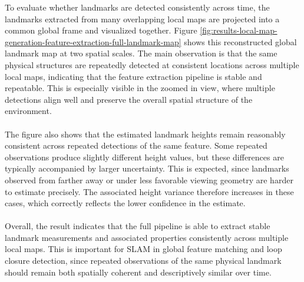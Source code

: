 \noindent
To evaluate whether landmarks are detected consistently across time, the landmarks extracted from many overlapping local maps are projected into a common global frame and visualized together. Figure \ref{fig:results-local-map-generation-feature-extraction-full-landmark-map} shows this reconstructed global landmark map at two spatial scales. The main observation is that the same physical structures are repeatedly detected at consistent locations across multiple local maps, indicating that the feature extraction pipeline is stable and repeatable. This is especially visible in the zoomed in view, where multiple detections align well and preserve the overall spatial structure of the environment.
\\ \\
The figure also shows that the estimated landmark heights remain reasonably consistent across repeated detections of the same feature. Some repeated observations produce slightly different height values, but these differences are typically accompanied by larger uncertainty. This is expected, since landmarks observed from farther away or under less favorable viewing geometry are harder to estimate precisely. The associated height variance therefore increases in these cases, which correctly reflects the lower confidence in the estimate.
\\ \\
Overall, the result indicates that the full pipeline is able to extract stable landmark measurements and associated properties consistently across multiple local maps. This is important for SLAM in global feature matching and loop closure detection, since repeated observations of the same physical landmark should remain both spatially coherent and descriptively similar over time.

\newpage

